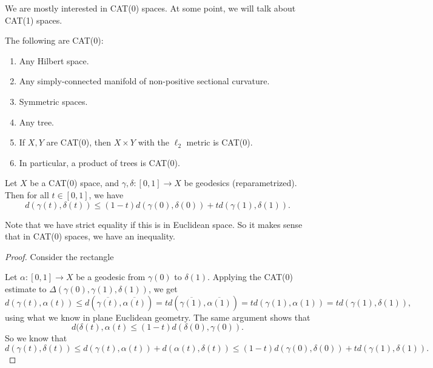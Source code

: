 \documentclass[a4paper]{article}
\begin{document}
We are mostly interested in CAT(0) spaces. At some point, we will talk about CAT(1) spaces.

\begin{eg}
  The following are CAT(0):
  \begin{enumerate}
    \item Any Hilbert space.
    \item Any simply-connected manifold of non-positive sectional curvature.
    \item Symmetric spaces.
    \item Any tree.
    \item If $X, Y$ are CAT(0), then $X \times Y$ with the $\ell_2$ metric is CAT(0).
    \item In particular, a product of trees is CAT(0).
  \end{enumerate}
\end{eg}

\begin{lemma}
  Let $X$ be a CAT(0) space, and $\gamma, \delta: [0, 1] \to X$ be geodesics (reparametrized). Then for all $t \in [0, 1]$, we have
  \[
    d(\gamma(t), \delta(t)) \leq (1 - t) d(\gamma(0), \delta(0)) + t d(\gamma(1), \delta(1)).
  \]
\end{lemma}
Note that we have strict equality if this is in Euclidean space. So it makes sense that in CAT(0) spaces, we have an inequality.
\begin{proof}
  Consider the rectangle
  \begin{center}
  \end{center}
  Let $\alpha: [0, 1] \to X$ be a geodesic from $\gamma(0)$ to $\delta(1)$. Applying the CAT(0) estimate to $\Delta(\gamma(0), \gamma(1), \delta(1))$, we get
  \[
    d(\gamma(t), \alpha(t)) \leq d(\overline{\gamma(t)}, \overline{\alpha(t)}) = t d(\overline{\gamma(1)}, \overline{\alpha(1)}) = t d(\gamma(1), \alpha(1)) = t d(\gamma(1), \delta(1)),
  \]
  using what we know in plane Euclidean geometry. The same argument shows that
  \[
    d(\delta(t), \alpha(t) \leq (1 - t) d(\delta(0), \gamma(0)).
  \]
  So we know that
  \[
    d(\gamma(t), \delta(t)) \leq d(\gamma(t), \alpha(t)) + d(\alpha(t), \delta(t)) \leq (1 - t) d(\gamma(0), \delta(0)) + t d(\gamma(1), \delta(1)).
  \]
\end{proof}
\end{document}
